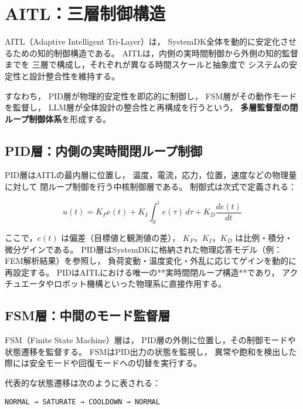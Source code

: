 \section{AITL：三層制御構造}

AITL（Adaptive Intelligent Tri-Layer）は，
SystemDK全体を動的に安定化させるための知的制御構造である。
AITLは，内側の実時間制御から外側の知的監督までを
三層で構成し，それぞれが異なる時間スケールと抽象度で
システムの安定性と設計整合性を維持する。

すなわち，
PID層が物理的安定性を即応的に制御し，
FSM層がその動作モードを監督し，
LLM層が全体設計の整合性と再構成を行うという，
\textbf{多層監督型の閉ループ制御体系}を形成する。

\subsection{PID層：内側の実時間閉ループ制御}
PID層はAITLの最内層に位置し，
温度，電流，応力，位置，速度などの物理量に対して
閉ループ制御を行う中核制御層である。
制御式は次式で定義される：

\begin{equation}
u(t) = K_P e(t) + K_I \int_{0}^{t} e(\tau)\,d\tau + K_D \frac{de(t)}{dt}
\end{equation}

ここで，$e(t)$ は偏差（目標値と観測値の差），
$K_P$，$K_I$，$K_D$ は比例・積分・微分ゲインである。
PID層はSystemDKに格納された物理応答モデル（例：FEM解析結果）を参照し，
負荷変動・温度変化・外乱に応じてゲインを動的に再設定する。
PIDはAITLにおける唯一の**実時間閉ループ構造**であり，
アクチュエータやロボット機構といった物理系に直接作用する。

\subsection{FSM層：中間のモード監督層}
FSM（Finite State Machine）層は，
PID層の外側に位置し，その制御モードや状態遷移を監督する。
FSMはPID出力の状態を監視し，
異常や飽和を検出した際には安全モードや回復モードへの切替を実行する。

代表的な状態遷移は次のように表される：

\begin{center}
\texttt{NORMAL → SATURATE → COOLDOWN → NORMAL}
\end{center}

